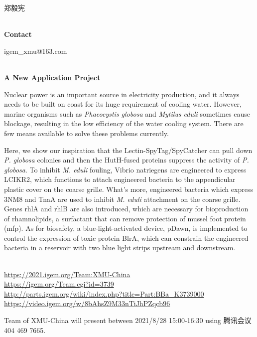   郑毅宪


\textbf{\\Contact}

  igem\_xmu@163.com


\textbf{\\A New Application Project\\}\begin{spacing}{1.5}

Nuclear power is an important source in electricity production, and it always needs to be built on coast for its huge requirement of cooling water. However, marine organisms such as \textit{Phaeocystis globosa} and \textit{Mytilus eduli} sometimes cause blockage, resulting in the low efficiency of the water cooling system. There are few means available to solve these problems currently.

Here, we show our inspiration that the Lectin-SpyTag/SpyCatcher can pull down \textit{P. globosa} colonies and then the HutH-fused proteins suppress the activity of \textit{P. globosa}. To inhibit \textit{M. eduli} fouling, Vibrio natriegens are engineered to express LCIKR2, which functions to attach engineered bacteria to the appendicular plastic cover on the coarse grille. What's more, engineered bacteria which express 3NM8 and TnaA are used to inhibit \textit{M. eduli} attachment on the coarse grille. Genes rhlA and rhlB are also introduced, which are necessary for bioproduction of rhamnolipids, a surfactant that can remove protection of mussel foot protein (mfp). As for biosafety, a blue-light-activated device, pDawn, is implemented to control the expression of toxic protein BlrA, which can constrain the engineered bacteria in a reservoir with two blue light strips upstream and downstream.\end{spacing}
\\

\url{https://2021.igem.org/Team:XMU-China }\\
\url{https://igem.org/Team.cgi?id=3739 }\\
\url{http://parts.igem.org/wiki/index.php?title=Part:BBa_K3739000 }\\
\url{https://video.igem.org/w/8bAhsZ9M33nTiJhPZqcb96 }\\

\vfill{}









Team of XMU-China will present between       2021/8/28 15:00-16:30  using 腾讯会议 404 469 7665.
\newpage


